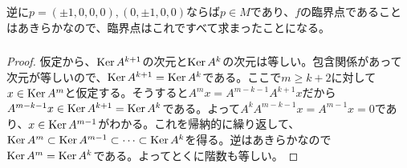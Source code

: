 \begin{sol}
\begin{description}
      逆に$p=(\pm 1, 0, 0 ,0), (0, \pm 1, 0, 0)$ならば$p \in M$であり、$f$の臨界点であることはあきらかなので、臨界点はこれですべて求まったことになる。
  \end{description}

\end{sol}


\newpage

\subsubsection{} %
\begin{proof}
  仮定から、$\operatorname{Ker} A^{k+1}$の次元と$\operatorname{Ker} A^k$の次元は等しい。包含関係があって次元が等しいので、$\operatorname{Ker} A^{k+1} = \operatorname{Ker} A^k$である。ここで$m \geq k +2$に対して$x \in \operatorname{Ker} A^m$と仮定する。そうすると$A^m x = A^{m-k-1} A^{k+1} x$だから$A^{m-k-1} x \in \operatorname{Ker} A^{k+1} = \operatorname{Ker} A^k$である。よって$A^k A^{m-k-1} x = A^{m-1} x = 0$であり、$x \in \operatorname{Ker} A^{m-1}$がわかる。これを帰納的に繰り返して、
  $\operatorname{Ker} A^m \subset \operatorname{Ker} A^{m-1} \subset \cdots \subset \operatorname{Ker} A^k$を得る。逆はあきらかなので$\operatorname{Ker} A^m = \operatorname{Ker} A^k$である。よってとくに階数も等しい。
\end{proof}
